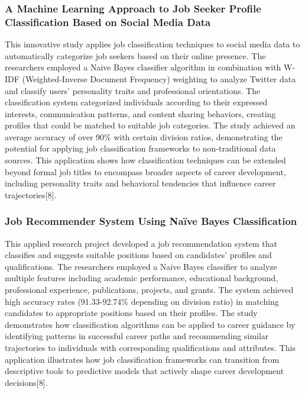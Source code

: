 \documentclass[
  letterpaper,
  DIV=11,
  numbers=noendperiod]{scrartcl}
\begin{document}
\subsubsection{A Machine Learning Approach to Job Seeker Profile
Classification Based on Social Media
Data}\label{a-machine-learning-approach-to-job-seeker-profile-classification-based-on-social-media-data}

This innovative study applies job classification techniques to social
media data to automatically categorize job seekers based on their online
presence. The researchers employed a Naive Bayes classifier algorithm in
combination with W-IDF (Weighted-Inverse Document Frequency) weighting
to analyze Twitter data and classify users' personality traits and
professional orientations. The classification system categorized
individuals according to their expressed interests, communication
patterns, and content sharing behaviors, creating profiles that could be
matched to suitable job categories. The study achieved an average
accuracy of over 90\% with certain division ratios, demonstrating the
potential for applying job classification frameworks to non-traditional
data sources. This application shows how classification techniques can
be extended beyond formal job titles to encompass broader aspects of
career development, including personality traits and behavioral
tendencies that influence career trajectories{[}8{]}.

\subsubsection{Job Recommender System Using Naïve Bayes
Classification}\label{job-recommender-system-using-nauxefve-bayes-classification}

This applied research project developed a job recommendation system that
classifies and suggests suitable positions based on candidates' profiles
and qualifications. The researchers employed a Naive Bayes classifier to
analyze multiple features including academic performance, educational
background, professional experience, publications, projects, and grants.
The system achieved high accuracy rates (91.33-92.74\% depending on
division ratio) in matching candidates to appropriate positions based on
their profiles. The study demonstrates how classification algorithms can
be applied to career guidance by identifying patterns in successful
career paths and recommending similar trajectories to individuals with
corresponding qualifications and attributes. This application
illustrates how job classification frameworks can transition from
descriptive tools to predictive models that actively shape career
development decisions{[}8{]}.
\end{document}
